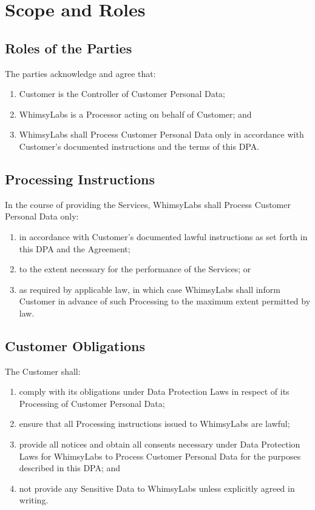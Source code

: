 \documentclass[11pt,a4paper]{article}
\begin{document}
\section{Scope and Roles}

\subsection{Roles of the Parties}
The parties acknowledge and agree that:
\begin{enumerate}[label=(\alph*)]
    \item Customer is the Controller of Customer Personal Data;
    \item WhimsyLabs is a Processor acting on behalf of Customer; and
    \item WhimsyLabs shall Process Customer Personal Data only in accordance with Customer's documented instructions and the terms of this DPA.
\end{enumerate}

\subsection{Processing Instructions}
In the course of providing the Services, WhimsyLabs shall Process Customer Personal Data only:
\begin{enumerate}[label=(\alph*)]
    \item in accordance with Customer's documented lawful instructions as set forth in this DPA and the Agreement;
    \item to the extent necessary for the performance of the Services; or
    \item as required by applicable law, in which case WhimsyLabs shall inform Customer in advance of such Processing to the maximum extent permitted by law.
\end{enumerate}

\subsection{Customer Obligations}
The Customer shall:
\begin{enumerate}[label=(\alph*)]
    \item comply with its obligations under Data Protection Laws in respect of its Processing of Customer Personal Data;
    \item ensure that all Processing instructions issued to WhimsyLabs are lawful;
    \item provide all notices and obtain all consents necessary under Data Protection Laws for WhimsyLabs to Process Customer Personal Data for the purposes described in this DPA; and
    \item not provide any Sensitive Data to WhimsyLabs unless explicitly agreed in writing.
\end{enumerate}
\end{document}
